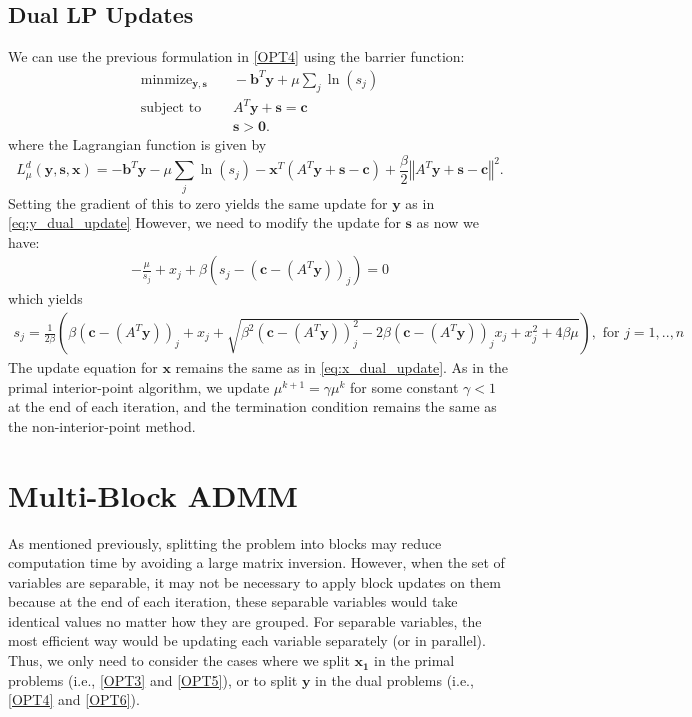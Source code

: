 \documentclass{article}
\begin{document}
\subsection*{Dual LP Updates}
We can use the previous formulation in \eqref{OPT4} using the barrier function:
\begin{align}
\text{minmize}_{\mathbf{y}, \mathbf{s}} &\quad -\mathbf{b}^T\mathbf{y} + \mu \sum_j \ln (s_j)  \tag{OPT6}\label{OPT6} \\
\text{subject to } &\quad  A^T \mathbf{y}  + \mathbf{s} = \mathbf{c}  \nonumber \\
&\quad \mathbf{s} > \mathbf{0} \nonumber.
\end{align}
where the Lagrangian function is given by
\[
L_{\mu}^{d}(\mathbf{y},\mathbf{s},\mathbf{x})=-\mathbf{b}^{T}\mathbf{y}-\mu\sum_{j}\ln\left(s_{j}\right)-\mathbf{x}^{T}\left(A^{T}\mathbf{y}+\mathbf{s}-\mathbf{c}\right)+\frac{\beta}{2}\left\Vert A^{T}\mathbf{y}+\mathbf{s}-\mathbf{c}\right\Vert ^{2}.
\]
Setting the gradient of this to zero yields the same update for $\mathbf{y}$ as in \eqref{eq:y_dual_update} 
However, we need to modify the update for $\mathbf{s}$ as now we have:
\begin{align}
- \frac{\mu}{s_j} + x_j  + \beta \left(s_j - (\mathbf{c} - (A^T \mathbf{y}))_j\right)= 0
\end{align}
which yields 
\begin{align}
s_j = \frac{1}{2\beta}\left(\beta (\mathbf{c} - (A^T \mathbf{y}))_j + x_j  + \sqrt{\beta^2 (\mathbf{c} - (A^T \mathbf{y}))_j^2 - 2\beta (\mathbf{c} - (A^T \mathbf{y}))_j x_{j} + x_j^2 + 4\beta\mu } \right), \text{ for $j = 1,..,n$}
\end{align}
The update equation for $\mathbf{x}$ remains the same as in \eqref{eq:x_dual_update}. As in the primal interior-point algorithm, we update $\mu^{k+1} = \gamma \mu^k$ for some constant $\gamma<1$ at the end of each iteration, and the termination condition remains the same as the non-interior-point method.



\vspace{0.2in}
\section{Multi-Block ADMM}

As mentioned previously, splitting the problem into blocks may reduce computation time by avoiding a large matrix inversion.
However, when the set of variables are separable, it may not be necessary to apply block updates on them because at the end of each iteration, these separable variables would take identical values no matter how they are grouped. For separable variables, the most efficient way would be updating each variable separately (or in parallel). Thus, we only need to consider the cases where we split $\mathbf{x_1}$ in the primal problems (i.e.,  \eqref{OPT3} and \eqref{OPT5}), or to split $\mathbf{y}$ in the dual problems (i.e.,  \eqref{OPT4} and \eqref{OPT6}).
\end{document}
